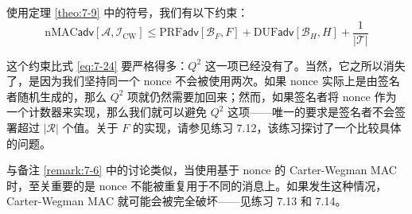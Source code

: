 \begin{theorem}\label{theo:7-10}
使用定理 \ref{theo:7-9} 中的符号，我们有以下约束：
\[
\mathrm{nMAC}\mathsf{adv}[\mathcal{A},\mathcal{I}_\mathrm{CW}]\leq\mathrm{PRF}\mathsf{adv}[\mathcal{B}_F,F]+\mathrm{DUF}\mathsf{adv}[\mathcal{B}_H,H]+\frac{1}{|\mathcal{T}|}
\]
\end{theorem}

这个约束比式 \ref{eq:7-24} 要严格得多：$Q^2$ 这一项已经没有了。当然，它之所以消失了，是因为我们坚持同一个 nonce 不会被使用两次。如果 nonce 实际上是由签名者随机生成的，那么 $Q^2$ 项就仍然需要加回来；然而，如果签名者将 nonce 作为一个计数器来实现，那么我们就可以避免 $Q^2$ 这项——唯一的要求是签名者不会签署超过 $|\mathcal{R}|$ 个值。关于 $F$ 的实现，请参见练习 7.12，该练习探讨了一个比较具体的问题。

与备注 \ref{remark:7-6} 中的讨论类似，当使用基于 nonce 的 Carter-Wegman MAC 时，至关重要的是 nonce 不能被重复用于不同的消息上。如果发生这种情况，Carter-Wegman MAC 就可能会被完全破坏——见练习 7.13 和 7.14。